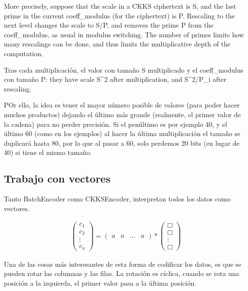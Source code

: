 More precisely, suppose that the scale in a CKKS ciphertext is S, and the
    last prime in the current coeff_modulus (for the ciphertext) is P. Rescaling
    to the next level changes the scale to S/P, and removes the prime P from the
    coeff_modulus, as usual in modulus switching. The number of primes limits
    how many rescalings can be done, and thus limits the multiplicative depth of
    the computation.


Tras cada multiplicación, el valor con tamaño S multiplicado y el coeff_modulus con tamaño P: they have scale S^2 after multiplication, and S^2/P_i after rescaling.

POr ello, la idea es tener el mayor número posible de valores (para poder hacer muchos productos) dejando el último más grande (realmente, el primer valor de la cadena) para no perder precisión. Si el penúltimo es por ejemplo 40, y el último 60 (como en los ejemplos) al hacer la última multiplicación el tamaño se duplicará hasta 80, por lo que al pasar a 60, solo perdemos 20 bits (en lugar de 40) si tiene el mismo tamaño.

\subsection{Trabajo con vectores}

Tanto BatchEncoder como CKKSEncoder, interpretan todos los datos como vectores.

\begin{gather}
  \begin{pmatrix}
    c_1 \\
    c_2 \\
    \vdots{} \\
    c_n
  \end{pmatrix}
  =
  \begin{pmatrix}
    a & a & \hdots{} &  a
  \end{pmatrix}
  *
  \begin{pmatrix}
    \Box \\
    \Box \\
    \vdots{} \\
    \Box
  \end{pmatrix}
\end{gather}

Una de las cosas más interesantes de esta forma de codificar los datos, es que se pueden rotar las columnas y las filas. La rotación es cíclica, cuando se rota una posición a la izquierda, el primer valor pasa a la última posición.

